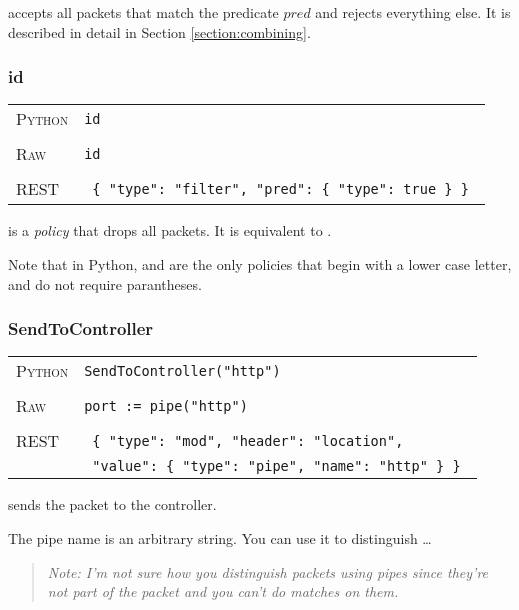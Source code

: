  accepts all packets that match the predicate $pred$ and rejects everything else.
It is described in detail in Section \ref{section:combining}.

\subsubsection{id}

\bigskip
\begin{tabularx}{\linewidth}{lX}
\textsc{Python}   & \texttt{id} \\ \\
\textsc{Raw}   & \texttt{id} \\ \\
\textsc{REST} & \texttt{ \{ "type": "filter", "pred": \{ "type": true \} \} } 
\end{tabularx}

 is a \emph{policy} that drops all packets.  It is equivalent to .

Note that in Python,  and  are the only policies that begin with a lower case
letter, and do not require parantheses.  

\subsubsection{SendToController}

\bigskip
\begin{tabularx}{\linewidth}{lX}
\textsc{Python}   & \texttt{SendToController("http")} \\ \\
\textsc{Raw}    & \texttt{port := pipe("http")}     \\ \\
\textsc{REST} & \texttt{ \{ "type": "mod", "header": "location", } \\
 & \texttt{ "value": \{ "type": "pipe", "name": "http" \} \} } 
\end{tabularx}

 sends the packet to the controller.   

The pipe name is an arbitrary string.  You can use it to distinguish \ldots

\begin{quotation}
\emph{Note: I'm not sure how you distinguish packets using pipes since they're not part of the 
packet and you can't do matches on them.}
\end{quotation}

